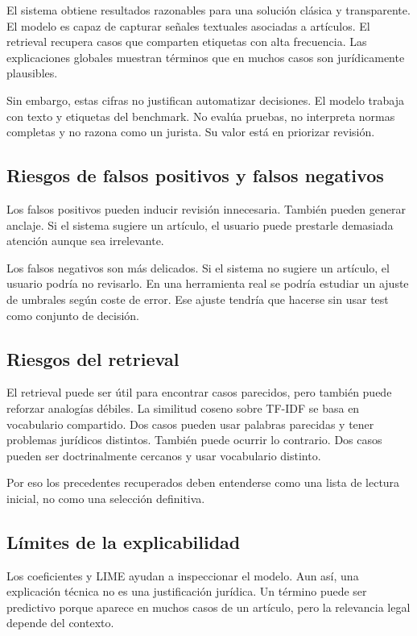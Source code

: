 \documentclass[11pt,a4paper]{article}
\begin{document}
El sistema obtiene resultados razonables para una solución clásica y transparente. El modelo es capaz de capturar señales textuales asociadas a artículos. El retrieval recupera casos que comparten etiquetas con alta frecuencia. Las explicaciones globales muestran términos que en muchos casos son jurídicamente plausibles.

Sin embargo, estas cifras no justifican automatizar decisiones. El modelo trabaja con texto y etiquetas del benchmark. No evalúa pruebas, no interpreta normas completas y no razona como un jurista. Su valor está en priorizar revisión.

\subsection{Riesgos de falsos positivos y falsos negativos}

Los falsos positivos pueden inducir revisión innecesaria. También pueden generar anclaje. Si el sistema sugiere un artículo, el usuario puede prestarle demasiada atención aunque sea irrelevante.

Los falsos negativos son más delicados. Si el sistema no sugiere un artículo, el usuario podría no revisarlo. En una herramienta real se podría estudiar un ajuste de umbrales según coste de error. Ese ajuste tendría que hacerse sin usar test como conjunto de decisión.

\subsection{Riesgos del retrieval}

El retrieval puede ser útil para encontrar casos parecidos, pero también puede reforzar analogías débiles. La similitud coseno sobre TF-IDF se basa en vocabulario compartido. Dos casos pueden usar palabras parecidas y tener problemas jurídicos distintos. También puede ocurrir lo contrario. Dos casos pueden ser doctrinalmente cercanos y usar vocabulario distinto.

Por eso los precedentes recuperados deben entenderse como una lista de lectura inicial, no como una selección definitiva.

\subsection{Límites de la explicabilidad}

Los coeficientes y LIME ayudan a inspeccionar el modelo. Aun así, una explicación técnica no es una justificación jurídica. Un término puede ser predictivo porque aparece en muchos casos de un artículo, pero la relevancia legal depende del contexto.
\end{document}

